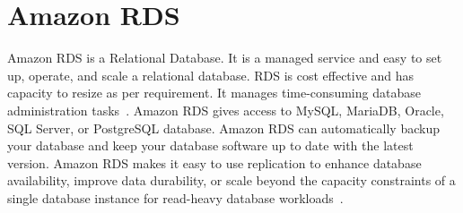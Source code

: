 \section{Amazon RDS}

Amazon RDS is a Relational Database. It is a managed service and easy to set up,
operate, and scale a relational database. RDS is cost effective and has capacity
to resize as per requirement. It manages time-consuming database administration
tasks~\cite{hid-sp18-420-amazon-RDS-FAQ}. Amazon RDS gives access to MySQL,
MariaDB, Oracle, SQL Server, or PostgreSQL database. Amazon RDS can
automatically backup your database and keep your database software up to date
with the latest version. Amazon RDS makes it easy to use replication to enhance
database availability, improve data durability, or scale beyond the capacity
constraints of a single database instance for read-heavy database
workloads~\cite{hid-sp18-420-amazon-RDS-FAQ}.
